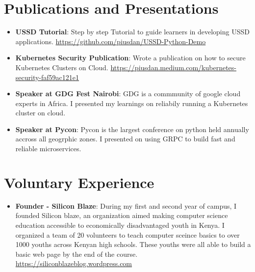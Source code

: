 \documentclass[letterpaper,11pt]{article}
\newcommand{\resumeItem}[2]{
  \item\small{
    \textbf{#1}{: #2 \vspace{-2pt}}
  }
}
\newcommand{\resumeSubItem}[2]{\resumeItem{#1}{#2}\vspace{-4pt}}
\newcommand{\resumeSubHeadingListStart}{\begin{itemize}[leftmargin=*]}
\newcommand{\resumeSubHeadingListEnd}{\end{itemize}}
\begin{document}
\section{Publications and Presentations}
  \resumeSubHeadingListStart 
    \resumeSubItem{USSD Tutorial}
      {Step by step Tutorial to guide learners in developing USSD applications. \href{https://github.com/piusdan/USSD-Python-Demo}{https://github.com/piusdan/USSD-Python-Demo}}
    \resumeSubItem{Kubernetes Security Publication}
      {Wrote a publication on how to secure Kubernetes Clusters on Cloud. \href{https://piusdan.medium.com/kubernetes-security-faf59ac121e1}{https://piusdan.medium.com/kubernetes-security-faf59ac121e1}}
  	\resumeSubItem{Speaker at GDG Fest Nairobi}
      {GDG is a commmunity of google cloud experts in Africa. I presented my learnings on reliabily running a Kubernetes cluster on cloud.}
  	\resumeSubItem{Speaker at Pycon}
      {Pycon is the largest conference on python held annually accross all geogrphic zones. I presented on using GRPC to build fast and reliable microservices.}
  \resumeSubHeadingListEnd

\section{Voluntary Experience}
  \resumeSubHeadingListStart  
    \resumeSubItem{Founder - Silicon Blaze}
      {During my first and second year of campus, I founded Silicon blaze, an organization aimed making computer science education accessible to economically disadvantaged youth in Kenya. I organized a team of 20 volunteers to teach computer sceince basics to over 1000 youths across Kenyan high schools. These youths were all able to build a basic web page by the end of the course. \href{https://siliconblazeblog.wordpress.com/}{https://siliconblazeblog.wordpress.com}}
  \resumeSubHeadingListEnd

\end{document}
